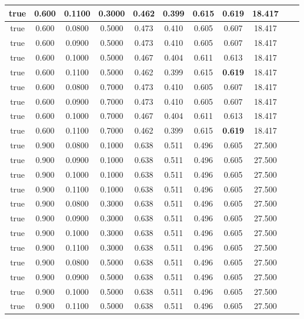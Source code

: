 \begin{longtable}[c]{|c|c|c|c|c|c|c|c|c|c|c|}
 true & 0.600 & 0.1100 & 0.3000 & 0.462 & 0.399 & 0.615 & \cellcolor{gray!20} \textbf{0.619} & 18.417  \\ \hline 
 true & 0.600 & 0.0800 & 0.5000 & 0.473 & 0.410 & 0.605 & 0.607 & 18.417  \\ \hline 
 true & 0.600 & 0.0900 & 0.5000 & 0.473 & 0.410 & 0.605 & 0.607 & 18.417  \\ \hline 
 true & 0.600 & 0.1000 & 0.5000 & 0.467 & 0.404 & 0.611 & 0.613 & 18.417  \\ \hline 
 true & 0.600 & 0.1100 & 0.5000 & 0.462 & 0.399 & 0.615 & \cellcolor{gray!20} \textbf{0.619} & 18.417  \\ \hline 
 true & 0.600 & 0.0800 & 0.7000 & 0.473 & 0.410 & 0.605 & 0.607 & 18.417  \\ \hline 
 true & 0.600 & 0.0900 & 0.7000 & 0.473 & 0.410 & 0.605 & 0.607 & 18.417  \\ \hline 
 true & 0.600 & 0.1000 & 0.7000 & 0.467 & 0.404 & 0.611 & 0.613 & 18.417  \\ \hline 
 true & 0.600 & 0.1100 & 0.7000 & 0.462 & 0.399 & 0.615 & \cellcolor{gray!20} \textbf{0.619} & 18.417  \\ \hline 
 true & 0.900 & 0.0800 & 0.1000 & 0.638 & 0.511 & 0.496 & 0.605 & 27.500  \\ \hline 
 true & 0.900 & 0.0900 & 0.1000 & 0.638 & 0.511 & 0.496 & 0.605 & 27.500  \\ \hline 
 true & 0.900 & 0.1000 & 0.1000 & 0.638 & 0.511 & 0.496 & 0.605 & 27.500  \\ \hline 
 true & 0.900 & 0.1100 & 0.1000 & 0.638 & 0.511 & 0.496 & 0.605 & 27.500  \\ \hline 
 true & 0.900 & 0.0800 & 0.3000 & 0.638 & 0.511 & 0.496 & 0.605 & 27.500  \\ \hline 
 true & 0.900 & 0.0900 & 0.3000 & 0.638 & 0.511 & 0.496 & 0.605 & 27.500  \\ \hline 
 true & 0.900 & 0.1000 & 0.3000 & 0.638 & 0.511 & 0.496 & 0.605 & 27.500  \\ \hline 
 true & 0.900 & 0.1100 & 0.3000 & 0.638 & 0.511 & 0.496 & 0.605 & 27.500  \\ \hline 
 true & 0.900 & 0.0800 & 0.5000 & 0.638 & 0.511 & 0.496 & 0.605 & 27.500  \\ \hline 
 true & 0.900 & 0.0900 & 0.5000 & 0.638 & 0.511 & 0.496 & 0.605 & 27.500  \\ \hline 
 true & 0.900 & 0.1000 & 0.5000 & 0.638 & 0.511 & 0.496 & 0.605 & 27.500  \\ \hline 
 true & 0.900 & 0.1100 & 0.5000 & 0.638 & 0.511 & 0.496 & 0.605 & 27.500  \\ \hline 

\end{longtable}
